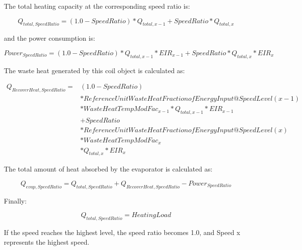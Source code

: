The total heating capacity at the corresponding speed ratio is:

\begin{equation}
{Q_{total,SpeedRatio}} = \left( {1.0 - SpeedRatio} \right)*{Q_{total,x - 1}} + SpeedRatio*{Q_{total,x}}
\end{equation}

and the power consumption is:

\begin{equation}
Powe{r_{SpeedRatio}} = \left( {1.0 - SpeedRatio} \right)*{Q_{total,x - 1}}*EI{R_{x - 1}} + SpeedRatio*{Q_{total,x}}*EI{R_x}
\end{equation}

The waste heat generated by this coil object is calculated as:

\begin{equation}
  \begin{array}{rl}
    Q_{RecoverHeat,SpeedRatio} =& \left( 1.0 - SpeedRatio \right) \\
                               &* ReferenceUnitWasteHeatFractionofEnergyInput@SpeedLevel\left( {x - 1} \right) \\
                               &* WasteHeatTempModFac_{x - 1} * Q_{total,x - 1} * EIR_{x - 1} \\
                               &+ SpeedRatio \\
                               &* ReferenceUnitWasteHeatFractionofEnergyInput@SpeedLevel\left( x \right) \\
                               &* WasteHeatTempModFac_x \\
                               &* Q_{total,x} * EIR_x
  \end{array}
\end{equation}

The total amount of heat absorbed by the evaporator is calculated as:

\begin{equation}
{Q_{evap,SpeedRatio}} = {Q_{total,SpeedRatio}} + {Q_{RecoverHeat,SpeedRatio}} - Powe{r_{SpeedRatio}}
\end{equation}

Finally:

\begin{equation}
{Q_{total,SpeedRatio}} = HeatingLoad
\end{equation}

If the speed reaches the highest level, the speed ratio becomes 1.0, and Speed x represents the highest speed.

